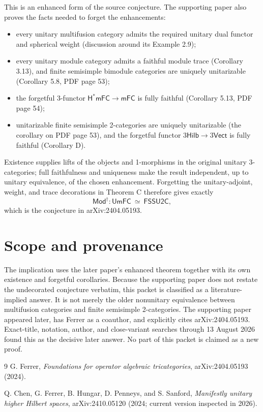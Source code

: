 \documentclass[11pt]{article}
\begin{document}
This is an enhanced form of the source conjecture.  The supporting paper also
proves the facts needed to forget the enhancements:
\begin{itemize}
\item every unitary multifusion category admits the required unitary dual
functor and spherical weight (discussion around its Example 2.9);
\item every unitary module category admits a faithful module trace (Corollary
3.13), and finite semisimple bimodule categories are uniquely unitarizable
(Corollary 5.8, PDF page 53);
\item the forgetful 3-functor
$\mathsf{H}^{*}\mathsf{mFC}\to\mathsf{mFC}$ is fully faithful (Corollary 5.13,
PDF page 54);
\item unitarizable finite semisimple 2-categories are uniquely unitarizable
(the corollary on PDF page 53), and the forgetful functor
$3\mathsf{Hilb}\to3\mathsf{Vect}$ is fully faithful (Corollary D).
\end{itemize}

Existence supplies lifts of the objects and 1-morphisms in the original
unitary 3-categories; full faithfulness and uniqueness make the result
independent, up to unitary equivalence, of the chosen enhancement.  Forgetting
the unitary-adjoint, weight, and trace decorations in Theorem C therefore gives
exactly
\[
 \mathsf{Mod}^{\dagger}\colon
 \mathsf{UmFC}\ \simeq\ \mathsf{FSSU2C},
\]
which is the conjecture in arXiv:2404.05193.

\section*{Scope and provenance}

The implication uses the later paper's enhanced theorem together with its own
existence and forgetful corollaries.  Because the supporting paper does not
restate the undecorated conjecture verbatim, this packet is classified as a
literature-implied answer.  It is not merely the older nonunitary
equivalence between multifusion categories and finite semisimple
2-categories.  The supporting paper appeared later, has Ferrer as a coauthor,
and explicitly cites arXiv:2404.05193.  Exact-title, notation, author, and
close-variant searches through 13 August 2026 found this as the decisive later
answer.  No part of this packet is claimed as a new proof.

\begin{thebibliography}{9}
G. Ferrer,
\emph{Foundations for operator algebraic tricategories},
arXiv:2404.05193 (2024).

Q. Chen, G. Ferrer, B. Hungar, D. Penneys, and S. Sanford,
\emph{Manifestly unitary higher Hilbert spaces},
arXiv:2410.05120 (2024; current version inspected in 2026).
\end{thebibliography}
\end{document}

